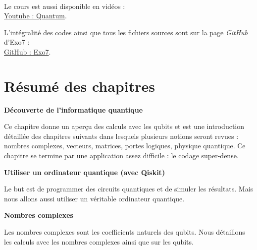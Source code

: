   

~
\bigskip
\vfill
\begin{center}
    Le cours est aussi disponible en vidéos :\\
    \href{https://www.youtube.com/channel/UCgeO7CtfYSdWt0PPZ3vafqw}
    {Youtube : \og{}Quantum\fg{}}.    
    
L'intégralité des codes \Python{} ainsi que tous les fichiers sources sont sur la page \emph{GitHub} d'Exo7 :\\
\href{https://github.com/exo7math/}{\og{}GitHub : Exo7\fg{}}.
\end{center}
\vfill




\cleardoublepage
\thispagestyle{empty}
\tableofcontents

\cleardoublepage
\section*{Résumé des chapitres}


\newcommand{\titrechapitre}[1]{{\textbf{#1}}\nopagebreak}
\newcommand{\descriptionchapitre}[1]{%
\smallskip\hfill
\begin{minipage}{0.95\textwidth}\small#1\end{minipage}\medskip\smallskip}


\titrechapitre{Découverte de l'informatique quantique}

\descriptionchapitre{Ce chapitre donne un aperçu des calculs avec les qubits et est une introduction détaillée des chapitres suivants dans lesquels plusieurs notions seront revues : nombres complexes, vecteurs, matrices, portes logiques, physique quantique. Ce chapitre se termine par une application assez difficile : le codage super-dense.}

\titrechapitre{Utiliser un ordinateur quantique (avec Qiskit)}

\descriptionchapitre{Le but est de programmer des circuits quantiques et de simuler les résultats. Mais nous allons aussi utiliser un véritable ordinateur quantique.}

\titrechapitre{Nombres complexes}

\descriptionchapitre{Les nombres complexes sont les coefficients naturels des qubits. Nous détaillons les calculs avec les nombres complexes ainsi que sur les qubits.}

